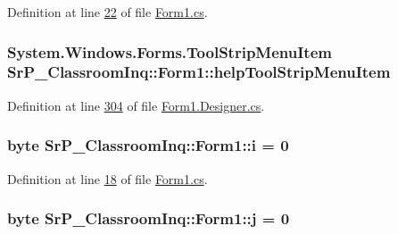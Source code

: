\-Definition at line \hyperlink{_form1_8cs_source_l00022}{22} of file \hyperlink{_form1_8cs_source}{\-Form1.\-cs}.

\hypertarget{class_sr_p___classroom_inq_1_1_form1_af2e7406cd9ae537ac3b0c16863a28908}{
\subsubsection[{help\-Tool\-Strip\-Menu\-Item}]{\setlength{\rightskip}{0pt plus 5cm}\-System.\-Windows.\-Forms.\-Tool\-Strip\-Menu\-Item {\bf \-Sr\-P\-\_\-\-Classroom\-Inq\-::\-Form1\-::help\-Tool\-Strip\-Menu\-Item}}}
\label{class_sr_p___classroom_inq_1_1_form1_af2e7406cd9ae537ac3b0c16863a28908}


\-Definition at line \hyperlink{_form1_8_designer_8cs_source_l00304}{304} of file \hyperlink{_form1_8_designer_8cs_source}{\-Form1.\-Designer.\-cs}.

\hypertarget{class_sr_p___classroom_inq_1_1_form1_a1b143fe38b39e80261a1a066026598f2}{
\subsubsection[{i}]{\setlength{\rightskip}{0pt plus 5cm}byte {\bf \-Sr\-P\-\_\-\-Classroom\-Inq\-::\-Form1\-::i} = 0}}
\label{class_sr_p___classroom_inq_1_1_form1_a1b143fe38b39e80261a1a066026598f2}


\-Definition at line \hyperlink{_form1_8cs_source_l00018}{18} of file \hyperlink{_form1_8cs_source}{\-Form1.\-cs}.

\hypertarget{class_sr_p___classroom_inq_1_1_form1_a12371b97e1ace5625af631c234829cee}{
\subsubsection[{j}]{\setlength{\rightskip}{0pt plus 5cm}byte {\bf \-Sr\-P\-\_\-\-Classroom\-Inq\-::\-Form1\-::j} = 0}}
\label{class_sr_p___classroom_inq_1_1_form1_a12371b97e1ace5625af631c234829cee}


